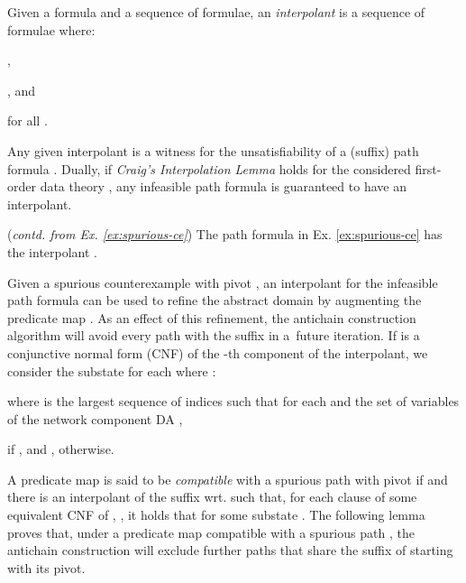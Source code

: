 \documentclass{llncs}
\begin{document}
\begin{definition}\label{def:interpolant}
  Given a formula  and a sequence
   of formulae, an \emph{interpolant} is
  a sequence of formulae  where:\begin{inparaenum}[(1)]
  \item , 
  \item , and
  \item  for all .
  \end{inparaenum}
\end{definition}
\vspace*{-0.5mm}Any given interpolant is a witness for the unsatisfiability of a
(suffix) path formula . Dually, if \emph{Craig's
  Interpolation Lemma} \cite{craig} holds for the considered
first-order data theory , any infeasible path formula is
guaranteed to have an interpolant.

\begin{example}(\emph{contd. from Ex. \ref{ex:spurious-ce}}) 
The path formula  in Ex. \ref{ex:spurious-ce} has
the interpolant .  \end{example}

Given a spurious counterexample  with pivot , an
interpolant  for the
infeasible path formula  can be used to refine the
abstract domain by augmenting the predicate map . As an effect of
this refinement, the antichain construction algorithm will avoid every
path with the suffix  in a~future iteration. If  is a
conjunctive normal form (CNF) of the -th component of the
interpolant, we consider the substate  for
each  where :\begin{compactitem}
\item  where  is the largest sequence of indices
  such that  for
  each  and the
  set  of variables of the network component DA ,
\item  if , and , otherwise.
\end{compactitem} 

A predicate map  is said to be \emph{compatible} with a spurious
path 
with pivot  if  and there is an
interpolant  of the suffix
 wrt.  such that, for each
clause  of some equivalent CNF of , , it holds
that  for some substate . The
following lemma proves that, under a predicate map compatible with a
spurious path , the antichain construction will exclude further
paths that share the suffix of  starting with its pivot.
\end{document}
